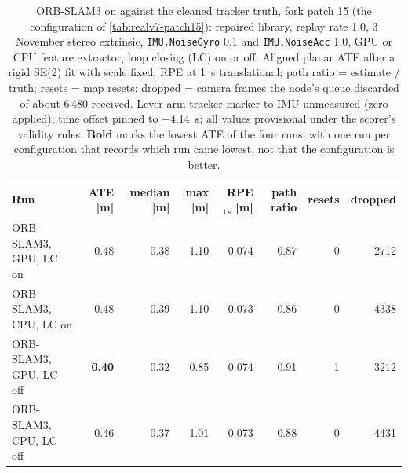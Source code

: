 \begin{table}[htbp]
\centering
\scriptsize\setlength{\tabcolsep}{3pt}
\caption[Realv6: every surviving run against the cleaned tracker truth.]{ORB-SLAM3 on  against the cleaned tracker truth, fork patch 15 (the configuration of \cref{tab:realv7-patch15}): repaired library, replay rate 1.0, 3 November stereo extrinsic, \texttt{IMU.NoiseGyro} 0.1 and \texttt{IMU.NoiseAcc} 1.0, GPU or CPU feature extractor, loop closing (LC) on or off. Aligned planar ATE after a rigid SE(2) fit with scale fixed; RPE at \SI{1}{\second} translational; path ratio = estimate / truth; resets =  map resets; dropped = camera frames the node's queue discarded of about 6\,480 received. Lever arm tracker-marker to IMU unmeasured (zero applied); time offset pinned to \SI{-4.14}{\second}; all values provisional under the scorer's validity rules. \textbf{Bold} marks the lowest ATE of the four runs; with one run per configuration that records which run came lowest, not that the configuration is better.}
\label{tab:realv6-final}
\begin{tabular}{lrrrrrrr}
\toprule
Run & ATE [m] & median [m] & max [m] & RPE$_{1\,\mathrm{s}}$ [m] & path ratio & resets & dropped \\
\midrule
ORB-SLAM3, GPU, LC on & 0.48 & 0.38 & 1.10 & 0.074 & 0.87 & 0 & 2712 \\
ORB-SLAM3, CPU, LC on & 0.48 & 0.39 & 1.10 & 0.073 & 0.86 & 0 & 4338 \\
ORB-SLAM3, GPU, LC off & \textbf{0.40} & 0.32 & 0.85 & 0.074 & 0.91 & 1 & 3212 \\
ORB-SLAM3, CPU, LC off & 0.46 & 0.37 & 1.01 & 0.073 & 0.88 & 0 & 4431 \\
\bottomrule
\end{tabular}
\end{table}
